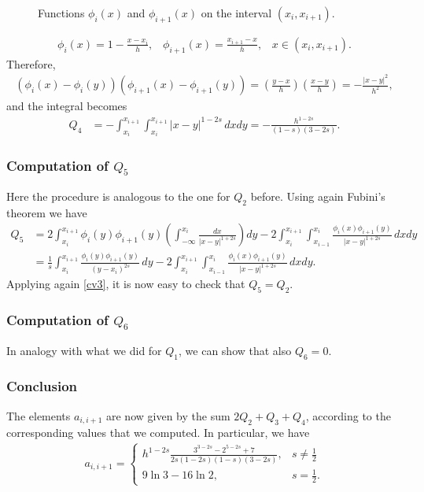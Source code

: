 {\begin{figure}[h]
\centerline{\box\figBoxA}
\caption{Functions $\phi_i(x)$ and $\phi_{i+1}(x)$ on the interval $(x_i,x_{i+1})$.}\label{basis2}
\end{figure}
\begin{align*}
	\phi_i(x) = 1-\frac{x-x_i}{h}, \;\;\; \phi_{i+1}(x) = \frac{x_{i+1}-x}{h}, \;\;\; x\in (x_i,x_{i+1}).
\end{align*}
Therefore, 
\begin{align*}
	(\phi_i(x)-\phi_i(y))(\phi_{i+1}(x)-\phi_{i+1}(y)) = \left(\frac{y-x}{h}\right)\left(\frac{x-y}{h}\right) = -\frac{|x-y|^2}{h^2},
\end{align*}
and the integral becomes
\begin{align*}
	Q_4 &= -\int_{x_i}^{x_{i+1}}\int_{x_i}^{x_{i+1}} |x-y|^{1-2s}\,dxdy = -\frac{h^{1-2s}}{(1-s)(3-2s)}. 
\end{align*}

\subsubsection*{Computation of $Q_5$}
Here the procedure is analogous to the one for $Q_2$ before. Using again Fubini's theorem we have
\begin{align*}
	Q_5 &= 2\int_{x_i}^{x_{i+1}}\phi_i(y)\phi_{i+1}(y)\left(\int_{-\infty}^{x_i} \frac{dx}{|x-y|^{1+2s}}\right)dy - 2\int_{x_i}^{x_{i+1}}\int_{x_{i-1}}^{x_i} \frac{\phi_i(x)\phi_{i+1}(y)}{|x-y|^{1+2s}}\,dxdy 
	\\
	&= \frac{1}{s}\int_{x_i}^{x_{i+1}}\frac{\phi_i(y)\phi_{i+1}(y)}{(y-x_i)^{2s}}\,dy - 2\int_{x_i}^{x_{i+1}}\int_{x_{i-1}}^{x_i} \frac{\phi_i(x)\phi_{i+1}(y)}{|x-y|^{1+2s}}\,dxdy. 
\end{align*}
Applying again \eqref{cv3}, it is now easy to check that $Q_5=Q_2$.

\subsubsection*{Computation of $Q_6$}
In analogy with what we did for $Q_1$, we can show that also $Q_6=0$.

\subsubsection*{Conclusion}
The elements $a_{i,i+1}$ are now given by the sum $2Q_2+Q_3+Q_4$, according to the corresponding values that we computed. In particular, we have
\begin{align*}
	a_{i,i+1} = \begin{cases}
					\displaystyle h^{1-2s}\frac{3^{3-2s}-2^{5-2s}+7}{2s(1-2s)(1-s)(3-2s)}, & \displaystyle s\neq \frac{1}{2}
					\\
					9\ln 3-16\ln 2, & \displaystyle s=\frac{1}{2}.
				\end{cases}	
\end{align*}

}
